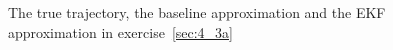 \documentclass[a4paper,oneside,article]{memoir}
\begin{document}
\begin{figure}[htb]
  \begin{adjustwidth}{-2in}{-2in}
	  \centering
  \end{adjustwidth}
  	  \caption{The true trajectory, the baseline approximation and the EKF approximation in exercise~\ref{sec:4_3a}}
	  \label{fig:ex_4_3}
\end{figure}



\begin{table}[h]
	\centering
	
	\label{table:rmse4_3}
\end{table}
\end{document}
